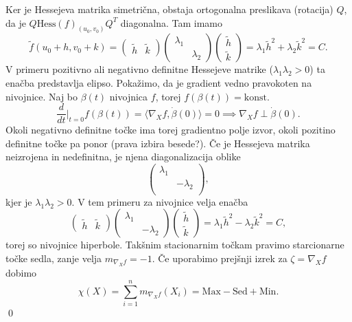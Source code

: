 Ker je Hessejeva matrika simetrična, obstaja ortogonalna preslikava (rotacija) $Q$, da je $Q\text{Hess}(f)_{(u_0,v_0)}Q^{T}$ diagonalna. Tam imamo \begin{equation*}
\tilde{f}(u_0 +h, v_0 + k) = \begin{pmatrix}
    \tilde{h} & \tilde{k} 
  \end{pmatrix}
  \begin{pmatrix}
    \lambda_1 &  \\
     & \lambda_2
  \end{pmatrix}  
  \begin{pmatrix}
    \tilde{h} \\
    \tilde{k} 
  \end{pmatrix} = \lambda_1 \tilde{h}^2 + \lambda_2 \tilde{k}^2 = C. 
\end{equation*}  
V primeru pozitivno ali negativno definitne Hessejeve matrike ($\lambda_1 \lambda_2  > 0$) ta enačba predstavlja elipso. Pokažimo, da je gradient vedno pravokoten na nivojnice. Naj bo $\beta(t)$ nivojnica $f$, torej $f(\beta(t)) = \text{konst.}$\begin{equation*}
\frac{d}{dt} \bigg|_{t = 0} f(\beta(t)) = \langle \nabla_X f, \dot{\beta}(0) \rangle  = 0 \implies \nabla_X f \perp \dot{\beta}(0).
\end{equation*}  
Okoli negativno definitne točke ima torej gradientno polje izvor, okoli pozitino definitne točke pa ponor (prava izbira besede?). Če je Hessejeva matrika neizrojena in nedefinitna, je njena diagonalizacija oblike \begin{equation*}
\begin{pmatrix}
    \lambda_1 & \\
     & -\lambda_2\\
\end{pmatrix},
\end{equation*}kjer je $\lambda_1 \lambda_2 > 0$. V tem primeru za nivojnice velja enačba \begin{equation*}
    \begin{pmatrix}
        \tilde{h} & \tilde{k} 
      \end{pmatrix}
      \begin{pmatrix}
        \lambda_1 &  \\
         & -\lambda_2
      \end{pmatrix}
      \begin{pmatrix}
        \tilde{h} \\
        \tilde{k} 
      \end{pmatrix} = \lambda_1 \tilde{h}^2 - \lambda_2 \tilde{k}^2 = C,
\end{equation*}  
torej so nivojnice hiperbole. Takšnim stacionarnim točkam pravimo starcionarne točke sedla, zanje velja $m_{\nabla_X f} = -1$. Če uporabimo prejšnji izrek za $\zeta = \nabla_X f$ dobimo \begin{equation*}
\chi(X) = \sum_{i = 1}^{n} m_{\nabla_X f}(X_i) = \text{Max} - \text{Sed} + \text{Min}.
\end{equation*}  
\qed